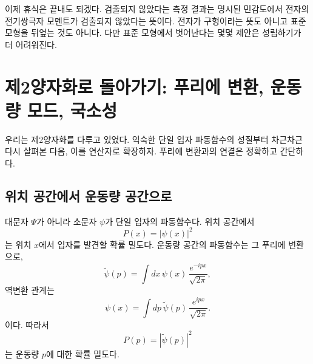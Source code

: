 \begin{classroomqa}
\end{classroomqa}

\begin{classroomqa}
\end{classroomqa}

이제 휴식은 끝내도 되겠다. 검출되지 않았다는 측정 결과는 명시된 민감도에서 전자의 전기쌍극자 모멘트가 검출되지 않았다는 뜻이다. 전자가 구형이라는 뜻도 아니고 표준 모형을 뒤엎는 것도 아니다. 다만 표준 모형에서 벗어난다는 몇몇 제안은 성립하기가 더 어려워진다.

\section{제2양자화로 돌아가기: 푸리에 변환, 운동량 모드, 국소성}

우리는 제2양자화를 다루고 있었다. 익숙한 단일 입자 파동함수의 성질부터 차근차근 다시 살펴본 다음, 이를 연산자로 확장하자. 푸리에 변환과의 연결은 정확하고 간단하다.

\subsection{위치 공간에서 운동량 공간으로}

대문자 \(\Psi\)가 아니라 소문자 \(\psi\)가 단일 입자의 파동함수다. 위치 공간에서
\begin{equation}
P(x)=|\psi(x)|^2
\end{equation}
는 위치 \(x\)에서 입자를 발견할 확률 밀도다. 운동량 공간의 파동함수는 그 푸리에 변환으로,
\begin{equation}
\tilde{\psi}(p)=\int dx\,\psi(x)\,\frac{e^{-ipx}}{\sqrt{2\pi}},
\end{equation}
역변환 관계는
\begin{equation}
\psi(x)=\int dp\,\tilde{\psi}(p)\,\frac{e^{ipx}}{\sqrt{2\pi}}.
\end{equation}
이다. 따라서
\begin{equation}
P(p)=|\tilde{\psi}(p)|^2
\end{equation}
는 운동량 \(p\)에 대한 확률 밀도다.

